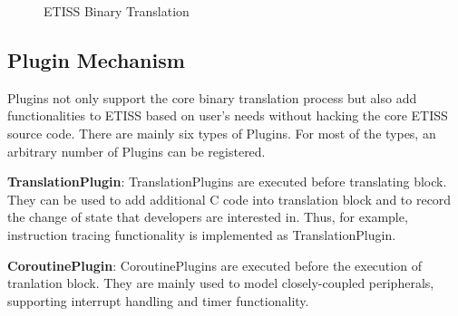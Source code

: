 \begin{figure}[htbp]
    \caption{ETISS Binary Translation}
    \label{fig:etiss_binary_translation}
\end{figure}

\subsection{Plugin Mechanism}
Plugins not only support the core binary translation process but also add functionalities to ETISS based on user's needs without hacking the core ETISS source code.
There are mainly six types of Plugins. For most of the types, an arbitrary number of Plugins can be registered.

\textbf{TranslationPlugin}: TranslationPlugins are executed before translating block. They can be used to add additional C code into translation block and to record the change of state that developers are interested in. Thus, for example, instruction tracing functionality is implemented as TranslationPlugin.

\textbf{CoroutinePlugin}: CoroutinePlugins are executed before the execution of tranlation block. They are mainly used to model closely-coupled peripherals, supporting
interrupt handling and timer functionality.

